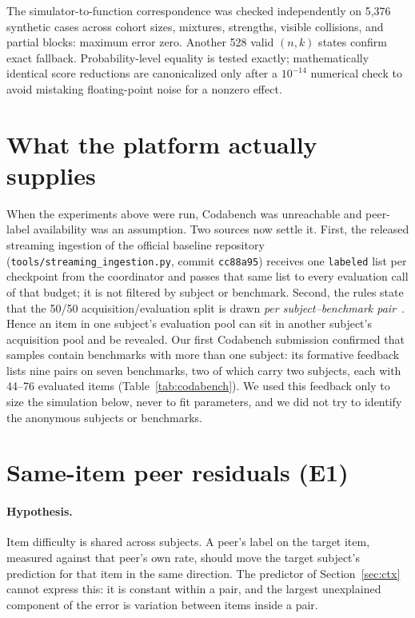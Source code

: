 \documentclass{article}
\begin{document}
The simulator-to-function correspondence was checked independently on
5,376 synthetic cases across cohort sizes, mixtures, strengths, visible
collisions, and partial blocks: maximum error zero. Another 528 valid
$(n,k)$ states confirm exact fallback. Probability-level equality is tested
exactly; mathematically identical score reductions are canonicalized only
after a $10^{-14}$ numerical check to avoid mistaking floating-point noise
for a nonzero effect.

\section{What the platform actually supplies}
When the experiments above were run, Codabench was unreachable and peer-label
availability was an assumption. Two sources now settle it. First, the released
streaming ingestion of the official baseline repository
(\texttt{tools/streaming\_ingestion.py}, commit \texttt{cc88a95}) receives one
\texttt{labeled} list per checkpoint from the coordinator and passes that same
list to every evaluation call of that budget; it is not filtered by subject or
benchmark. Second, the rules state that the 50/50 acquisition/evaluation split
is drawn \emph{per subject--benchmark pair}~\cite{competition}. Hence an item in
one subject's evaluation pool can sit in another subject's acquisition pool and
be revealed. Our first Codabench submission confirmed that samples contain
benchmarks with more than one subject: its formative feedback lists nine pairs
on seven benchmarks, two of which carry two subjects, each with 44--76 evaluated
items (Table~\ref{tab:codabench}). We used this feedback only to size the
simulation below, never to fit parameters, and we did not try to identify the
anonymous subjects or benchmarks.

\section{Same-item peer residuals (E1)}\label{sec:e1}
\paragraph{Hypothesis.} Item difficulty is shared across subjects. A peer's label
on the target item, measured against that peer's own rate, should move the
target subject's prediction for that item in the same direction. The predictor
of Section~\ref{sec:ctx} cannot express this: it is constant within a pair, and the
largest unexplained component of the error is variation between items inside a
pair.
\end{document}

